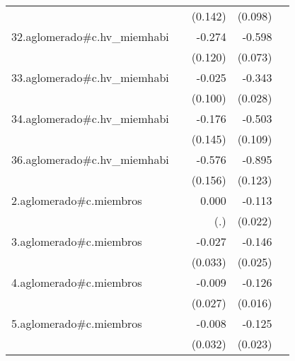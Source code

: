 {\begin{longtable}{l*{4}{D{.}{.}{-1}}}
            &                     &     (0.142)         &     (0.098)         &                     \\
\addlinespace
32.aglomerado#c.hv\_miemhabi&                     &      -0.274\sym{*}  &      -0.598\sym{***}&                     \\
            &                     &     (0.120)         &     (0.073)         &                     \\
\addlinespace
33.aglomerado#c.hv\_miemhabi&                     &      -0.025         &      -0.343\sym{***}&                     \\
            &                     &     (0.100)         &     (0.028)         &                     \\
\addlinespace
34.aglomerado#c.hv\_miemhabi&                     &      -0.176         &      -0.503\sym{***}&                     \\
            &                     &     (0.145)         &     (0.109)         &                     \\
\addlinespace
36.aglomerado#c.hv\_miemhabi&                     &      -0.576\sym{***}&      -0.895\sym{***}&                     \\
            &                     &     (0.156)         &     (0.123)         &                     \\
\addlinespace
2.aglomerado#c.miembros&                     &       0.000         &      -0.113\sym{***}&                     \\
            &                     &         (.)         &     (0.022)         &                     \\
\addlinespace
3.aglomerado#c.miembros&                     &      -0.027         &      -0.146\sym{***}&                     \\
            &                     &     (0.033)         &     (0.025)         &                     \\
\addlinespace
4.aglomerado#c.miembros&                     &      -0.009         &      -0.126\sym{***}&                     \\
            &                     &     (0.027)         &     (0.016)         &                     \\
\addlinespace
5.aglomerado#c.miembros&                     &      -0.008         &      -0.125\sym{***}&                     \\
            &                     &     (0.032)         &     (0.023)         &                     \\

\end{longtable}}

